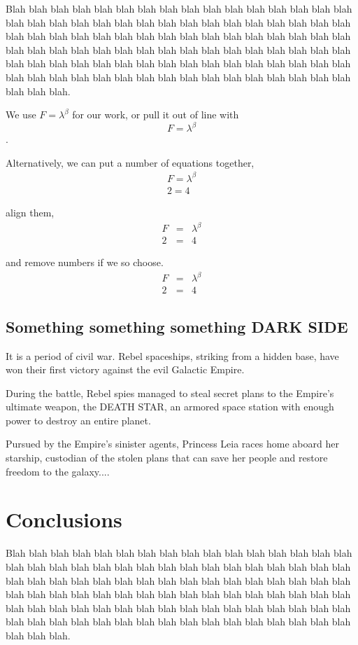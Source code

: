 \documentclass[twocolumn]{aastex61}
\begin{document}
Blah blah blah blah blah blah blah blah blah blah blah blah blah blah blah blah blah blah blah blah blah blah blah blah blah blah blah blah blah blah blah blah blah blah blah blah blah blah blah blah blah blah blah blah blah blah blah blah blah blah blah blah blah blah blah blah blah blah blah blah blah blah blah blah blah blah blah blah blah blah blah blah blah blah blah blah blah blah blah blah blah blah blah blah blah blah blah blah blah blah blah blah blah blah blah blah blah blah blah.

We use $F=\lambda^\beta$ for our work, or pull it out of line with $$F=\lambda^\beta$$.

Alternatively, we can put a number of equations together,
\begin{eqnarray}
F=\lambda^\beta\\
2=4
\end{eqnarray}

align them, 
\begin{eqnarray}
F&=&\lambda^\beta\\
2&=&4
\end{eqnarray}

and remove numbers if we so choose.
\begin{eqnarray*}
F&=&\lambda^\beta\\
2&=&4
\end{eqnarray*}


\subsection{Something something something DARK SIDE}

It is a period of civil war.
Rebel spaceships, striking
from a hidden base, have won
their first victory against
the evil Galactic Empire.

During the battle, Rebel
spies managed to steal secret
plans to the Empire's
ultimate weapon, the DEATH
STAR, an armored space
station with enough power
to destroy an entire planet.

Pursued by the Empire's
sinister agents, Princess
Leia races home aboard her
starship, custodian of the
stolen plans that can save her
people and restore
freedom to the galaxy....



\section{Conclusions}

Blah blah blah blah blah blah blah blah blah blah blah blah blah blah blah blah blah blah blah blah blah blah blah blah blah blah blah blah blah blah blah blah blah blah blah blah blah blah blah blah blah blah blah blah blah blah blah blah blah blah blah blah blah blah blah blah blah blah blah blah blah blah blah blah blah blah blah blah blah blah blah blah blah blah blah blah blah blah blah blah blah blah blah blah blah blah blah blah blah blah blah blah blah blah blah blah blah blah blah.
\end{document}
